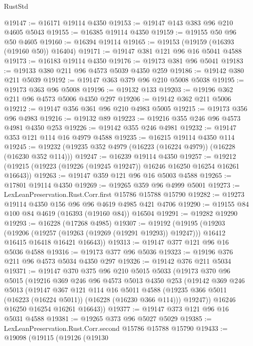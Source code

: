 \begin{lexlean}{RustStd}
\begin{coremodule}
@19147 := @16171 @19114 @4350
@19153 := @19147 @143 @383 @96 @210 @4605 @5043
@19155 := @16385 @19114 @4350
@19159 := @19155 @50 @96 @50 @4605
@19160 := @16394 @19114
@19165 := @19153 (@19159 (@16393 (@19160 @50)) @16404)
@19171 := @19147 @381 @121 @96 @16 @5041 @4588
@19173 := @16183 @19114 @4350
@19176 := @19173 @381 @96 @5041
@19183 := @19133 @380 @211 @96 @4573 @5039 @4350 @259
@19186 := @19142 @380 @211 @5039
@19192 := @19147 @363 @379 @96 @210 @5008 @5038
@19195 := @19173 @363 @96 @5008
@19196 := @19132 @133
@19203 := @19196 @362 @211 @96 @4573 @5006 @4350 @297
@19206 := @19142 @362 @211 @5006
@19212 := @19147 @356 @361 @96 @210 @4983 @5005
@19215 := @19173 @356 @96 @4983
@19216 := @19132 @89
@19223 := @19216 @355 @246 @96 @4573 @4981 @4350 @253
@19226 := @19142 @355 @246 @4981
@19232 := @19147 @353 @121 @114 @16 @4979 @4588
@19235 := @16215 @19114 @4350 @114
@19245 := @19232 (@19235 @352 @4979 (@16223 (@16224 @4979)) (@16228 (@16230 @352 @114)))
@19247 := @16239 @19114 @4350
@19257 := @19212 (@19215 (@19223 (@19226 (@19245 @19247)) @16246 @16250 @16254 @16261 @16643))
@19263 := @19147 @359 @121 @96 @16 @5003 @4588
@19265 := @17801 @19114 @4350
@19269 := @19265 @359 @96 @4999 @5001
@19273 := LexLeanPreservation.Rust.Corr.first @15786 @15788 @15790
@19282 := @19273 @19114 @4350 @156 @96 @96 @4619 @4985 @421 @4706
@19290 := @19155 @84 @100 @84 @4619 (@16393 (@19160 @84)) @16504
@19291 := @19282 @19290
@19293 := @16228 (@17268 @4985)
@19307 := @19192
    (@19195
      (@19203
        (@19206 (@19257 (@19263 (@19269 (@19291 @19293)) @19247)))
        @16412
        @16415
        @16418
        @16421
        @16643))
@19313 := @19147 @377 @121 @96 @16 @5036 @4588
@19316 := @19173 @377 @96 @5036
@19323 := @19196 @376 @211 @96 @4573 @5034 @4350 @297
@19326 := @19142 @376 @211 @5034
@19371 := @19147
    @370
    @375
    @96
    @210
    @5015
    @5033
    (@19173
      @370
      @96
      @5015
      (@19216
        @369
        @246
        @96
        @4573
        @5013
        @4350
        @253
        (@19142
          @369
          @246
          @5013
          (@19147
            @367
            @121
            @114
            @16
            @5011
            @4588
            (@19235 @366 @5011 (@16223 (@16224 @5011)) (@16228 (@16230 @366 @114)))
            @19247))
        @16246
        @16250
        @16254
        @16261
        @16643))
@19377 := @19147 @373 @121 @96 @16 @5031 @4588
@19381 := @19265 @373 @96 @5027 @5029
@19385 := LexLeanPreservation.Rust.Corr.second @15786 @15788 @15790
@19433 := @19098
    (@19115
      (@19126
        (@19130

\end{coremodule}
\end{lexlean}
